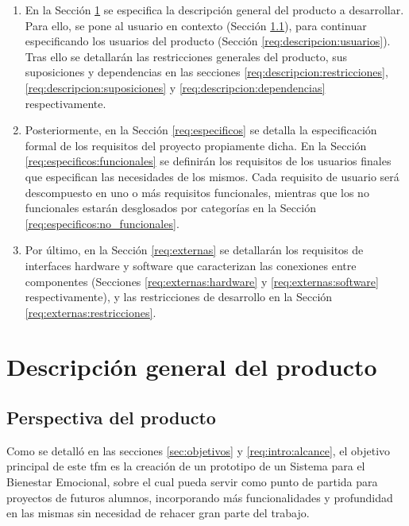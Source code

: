         \begin{enumerate}
            \item En la Sección \ref{req:descripcion} se especifica la descripción general del producto a desarrollar. Para ello, se pone al usuario en contexto (Sección \ref{req:descripcion:perspectiva}), para continuar especificando los usuarios del producto (Sección \ref{req:descripcion:usuarios}). Tras ello se detallarán las restricciones generales del producto, sus suposiciones y dependencias en las secciones 
            \ref{req:descripcion:restricciones}, \ref{req:descripcion:suposiciones} y \ref{req:descripcion:dependencias} respectivamente.
            \item Posteriormente, en la Sección \ref{req:especificos} se detalla la especificación formal de los requisitos del proyecto propiamente dicha. En la Sección \ref{req:especificos:funcionales} se definirán los requisitos de los usuarios finales que especifican las necesidades de los mismos. Cada requisito de usuario será descompuesto en uno o más requisitos funcionales, mientras que los no funcionales estarán desglosados por categorías en la Sección \ref{req:especificos:no_funcionales}.
            \item Por último, en la Sección \ref{req:externas} se detallarán los requisitos de interfaces hardware y software que caracterizan las conexiones entre componentes (Secciones \ref{req:externas:hardware} y \ref{req:externas:software} respectivamente), y las restricciones de desarrollo en la Sección \ref{req:externas:restricciones}.
        \end{enumerate}
        
\section{Descripción general del producto}
    \label{req:descripcion}

    \subsection{Perspectiva del producto}
        \label{req:descripcion:perspectiva}

        Como se detalló en las secciones \ref{sec:objetivos} y 
        \ref{req:intro:alcance}, el objetivo principal de este \gls{tfm} es la creación de un prototipo de un Sistema para el Bienestar Emocional, sobre el cual pueda servir como punto de partida para proyectos de futuros alumnos, incorporando más funcionalidades y profundidad en las mismas sin necesidad de rehacer gran parte del trabajo. 


